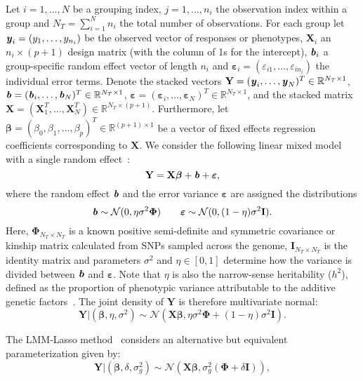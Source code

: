 \documentclass[10pt,letterpaper]{article}
\newcommand{\by}{\textbf{\emph{y}}}
\newcommand{\bX}{\textbf{X}}
\newcommand{\bY}{\textbf{Y}}
\newcommand{\bb}{\textbf{\emph{b}}}
\newcommand{\bI}{\textbf{I}}
\newcommand{\be}{\boldsymbol{\varepsilon}}
\newcommand{\bbeta}{\boldsymbol{\beta}}
\newcommand{\bPhi}{\boldsymbol{\Phi}}
\begin{document}
Let $i = 1, \ldots, N$ be a grouping index, $j = 1, \ldots, n_i$ the observation index within a group and $N_T = \sum_{i=1}^{N} n_i$ the total number of observations. For each group let \mbox{$\by_i = (y_1, \ldots, y_{n_i})$} be the observed vector of responses or phenotypes, $\bX_i$ an $n_i \times (p + 1)$ design matrix (with the column of 1s for the intercept), $\bb_i$ a group-specific random effect vector of length $n_i$ and \mbox{$\be_i = (\varepsilon_{i1}, \ldots, \varepsilon_{in_i})$} the individual error terms. Denote the stacked vectors $\bY = (\by_i, \ldots, \by_N)^T \in \mathbb{R}^{N_T \times 1}$, $\bb = (\bb_i, \ldots, \bb_N)^T \in \mathbb{R}^{N_T \times 1}$, \mbox{$\be = (\be_i, \ldots, \be_N)^T \in \mathbb{R}^{N_T \times 1}$}, and the stacked matrix \mbox{$\bX = (\bX_1^T, \ldots, \bX_N^T) \in \mathbb{R}^{N_T \times (p + 1)}$}. Furthermore, let $\bbeta = (\beta_0,\beta_1, \ldots, \beta_p)^T \in \mathbb{R}^{(p+1) \times 1}$ be a vector of fixed effects regression coefficients corresponding to $\bX$. We consider the following linear mixed model with a single random effect~\cite{pirinen2013efficient}:
\begin{equation*}
\bY = \bX \bbeta + \bb + \be,
\end{equation*}
where the random effect $\bb$ and the error variance $\be$ are assigned the distributions
\begin{equation*}
\bb \sim \mathcal{N}(0, \eta \sigma^2 \bPhi) \qquad \be \sim \mathcal{N}(0, (1-\eta)\sigma^2 \bI).
\end{equation*}
Here, $\bPhi_{N_T \times N_T}$ is a known positive semi-definite and symmetric covariance or kinship matrix calculated from SNPs sampled across the genome,   $\bI_{N_T \times N_T}$ is the identity matrix and parameters $\sigma^2$ and $\eta \in [0,1]$ determine how the variance is divided between $\bb$ and $\be$. Note that $\eta$ is also the narrow-sense heritability ($h^2$), defined as the proportion of phenotypic variance attributable to the additive genetic factors~\cite{manolio2009finding}. The joint density of $\bY$ is therefore multivariate normal:
\begin{equation}
\bY | (\bbeta, \eta, \sigma^2) \sim \mathcal{N}(\bX \bbeta, \eta \sigma^2 \bPhi + (1-\eta)\sigma^2 \bI) \label{eq:prinen}.
\end{equation}

The LMM-Lasso method~\cite{rakitsch2013lasso} considers an alternative but equivalent parameterization given by:
\begin{equation}
\bY | (\bbeta, \delta, \sigma_g^2) \sim \mathcal{N}(\bX \bbeta, \sigma_g^2(\bPhi + \delta\bI)) \label{eq:lippert},
\end{equation}
\end{document}
